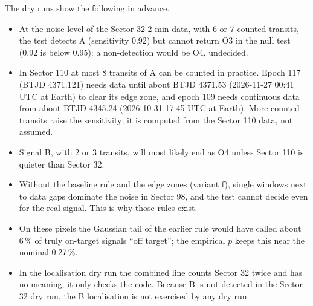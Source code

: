 The dry runs show the following in advance.
\begin{itemize}
\item At the noise level of the Sector 32 2-min data, with 6 or 7 counted transits, the test detects A (sensitivity
  0.92) but cannot return O3 in the null test (0.92 is below 0.95): a non-detection would be O4, undecided.
\item In Sector 110 at most 8 transits of A can be counted in practice. Epoch 117 (BTJD 4371.121) needs data until about
  BTJD 4371.53 (2026-11-27 00:41 UTC at Earth) to clear its edge zone, and epoch 109 needs continuous data from about
  BTJD 4345.24 (2026-10-31 17:45 UTC at Earth). More counted transits raise the sensitivity; it is computed from the
  Sector 110 data, not assumed.
\item Signal B, with 2 or 3 transits, will most likely end as O4 unless Sector 110 is quieter than Sector 32.
\item Without the baseline rule and the edge zones (variant f), single windows next to data gaps dominate the noise in
  Sector 98, and the test cannot decide even for the real signal. This is why those rules exist.
\item On these pixels the Gaussian tail of the earlier rule would have called about 6\,\% of truly on-target signals
  ``off target''; the empirical $p$ keeps this near the nominal 0.27\,\%.
\item In the localisation dry run the combined line counts Sector 32 twice and has no meaning; it only checks the code.
  Because B is not detected in the Sector 32 dry run, the B localisation is not exercised by any dry run.
\end{itemize}
